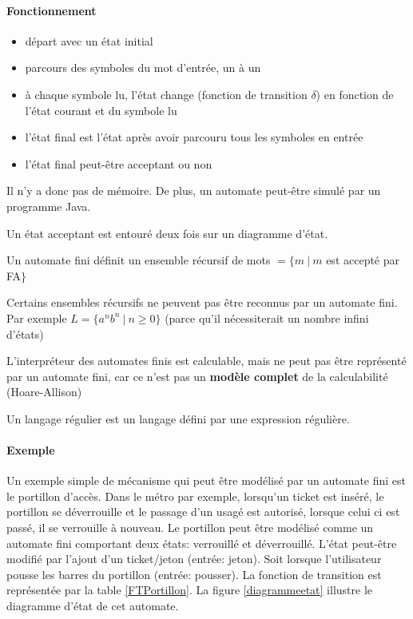 \paragraph{Fonctionnement}
\begin{itemize}
	\item départ avec un état initial
	\item parcours des symboles du mot d'entrée, un à un
	\item à chaque symbole lu, l'état change (fonction de transition
		$\delta$) en fonction de l'état courant et du symbole lu
	\item l'état final est l'état après avoir parcouru tous les symboles en
		entrée
	\item l'état final peut-être acceptant ou non
\end{itemize}

\begin{myrem}
	Il n'y a donc pas de mémoire. De plus, un automate peut-être simulé
	par un programme Java.
\end{myrem}

\begin{myrem}
	Un état acceptant est entouré deux fois sur un diagramme d'état.
\end{myrem}

\begin{myprop}
	Un automate fini définit un ensemble récursif de mots $=\{m \ |\ m$ est
		accepté par FA$\}$
\end{myprop}

\begin{myprop}
	Certains ensembles récursifs ne peuvent pas être reconnus par un
	automate fini. Par exemple $L = \{ a^n b^n \ | \ n\geq 0\}$ (parce qu'il nécessiterait un nombre infini d'états)
\end{myprop}

\begin{myprop}
	L'interpréteur des automates finis est calculable, mais ne peut pas être
	représenté par un automate fini, car ce n'est pas un \textbf{modèle
	complet} de la calculabilité (Hoare-Allison)
\end{myprop}

\begin{mydef} Un langage régulier est un langage défini par une expression
	régulière.
\end{mydef}

\paragraph{Exemple}
Un exemple simple de mécanisme qui peut être modélisé par un automate fini est le portillon d'accès. Dans le métro par exemple, lorsqu'un ticket est inséré, le portillon se déverrouille et le passage d'un usagé est autorisé, lorsque celui ci est passé, il se verrouille à nouveau. Le portillon peut être modélisé comme un automate fini comportant deux états: verrouillé et déverrouillé. L'état peut-être modifié par l'ajout d'un ticket/jeton (entrée: jeton). Soit lorsque l'utilisateur pousse les barres du portillon (entrée: pousser). La fonction de transition est représentée par la table \ref{FTPortillon}. La figure \ref{diagrammeetat} illustre le diagramme d'état de cet automate.

